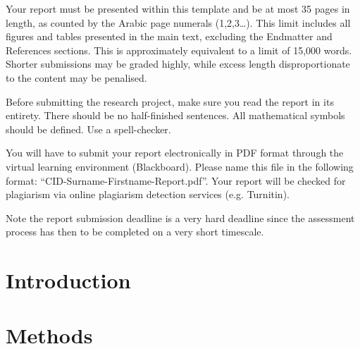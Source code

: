\documentclass{statsmsc}
\begin{document}
Your report must be presented within this template and be at most 35 pages in length, as counted by the Arabic page numerals (1,2,3…). This limit includes all figures and tables presented in the main text, excluding the Endmatter and References sections. This is approximately equivalent to a limit of 15,000 words. Shorter submissions may be graded highly, while excess length disproportionate to the content may be penalised.


Before submitting the research project, make sure you read the report in its entirety. There should be no half-finished sentences. All mathematical symbols should be defined. Use a spell-checker.

You will have to submit your report electronically in PDF format through the virtual learning environment (Blackboard). Please name this file in the following format: “CID-Surname-Firstname-Report.pdf”. Your report will be checked for plagiarism via online plagiarism detection services (e.g. Turnitin). 

Note the report submission deadline is a very hard deadline since the assessment process has then to be completed on a very short timescale.

\section{Introduction}






\section{Methods}\label{sec:methods}
\end{document}
